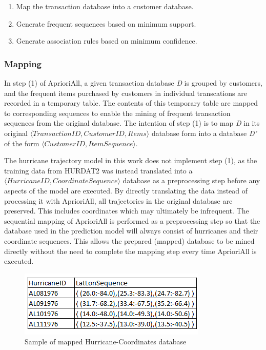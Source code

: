 \documentclass[12pt,conference]{IEEEtran}
\begin{document}
\begin{enumerate}
\item Map the transaction database into a customer database.
\item Generate frequent sequences based on minimum support.
\item Generate association rules based on minimum confidence.
\end{enumerate}

\subsubsection{Mapping}

In step (1) of AprioriAll, a given transaction database \textit{D} is grouped by customers, and the frequent items purchased by customers in individual transcations are recorded in a temporary table. The contents of this temporary table are mapped to corresponding sequences to enable the mining of frequent transaction sequences from the original database. The intention of step (1) is to map \textit{D} in its original $\langle TransactionID, CustomerID, Items\rangle$ database form into a database \textit{D'} of the form $\langle CustomerID, ItemSequence\rangle$. 

The hurricane trajectory model in this work does not implement step (1), as the training data from HURDAT2 was instead translated into a $\langle HurricaneID, CoordinateSequence\rangle$ database as a preprocessing step before any aspects of the model are executed. By directly translating the data instead of processing it with AprioriAll, all trajectories in the original database are preserved. This includes coordinates which may ultimately be infrequent. The sequential mapping of AprioriAll is performed as a preprocessing step so that the database used in the prediction model will always consist of hurricanes and their coordinate sequences. This allows the prepared (mapped) database to be mined directly without the need to complete the mapping step every time AprioriAll is executed.

\begin{figure}[ht]
\caption{Sample of mapped Hurricane-Coordinates database}
\centering
\includegraphics[scale=1.0]{hurricane-table-sample}
\end{figure}
\end{document}
